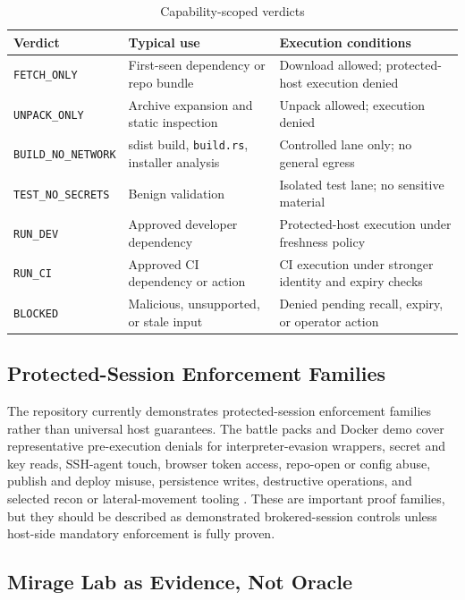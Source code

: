 \documentclass[conference]{IEEEtran}
\begin{document}
\begin{table}[t]
\caption{Capability-scoped verdicts}
\label{tab:verdicts}
\centering
\scriptsize
\setlength{\tabcolsep}{2pt}
\begin{tabularx}{\columnwidth}{@{}L{0.25\columnwidth}L{0.24\columnwidth}Y@{}}
\toprule
\textbf{Verdict} & \textbf{Typical use} & \textbf{Execution conditions} \\
\midrule
\texttt{FETCH\_ONLY} & First-seen dependency or repo bundle & Download allowed; protected-host execution denied \\
\texttt{UNPACK\_ONLY} & Archive expansion and static inspection & Unpack allowed; execution denied \\
\texttt{BUILD\_NO\_NETWORK} & sdist build, \texttt{build.rs}, installer analysis & Controlled lane only; no general egress \\
\texttt{TEST\_NO\_SECRETS} & Benign validation & Isolated test lane; no sensitive material \\
\texttt{RUN\_DEV} & Approved developer dependency & Protected-host execution under freshness policy \\
\texttt{RUN\_CI} & Approved CI dependency or action & CI execution under stronger identity and expiry checks \\
\texttt{BLOCKED} & Malicious, unsupported, or stale input & Denied pending recall, expiry, or operator action \\
\bottomrule
\end{tabularx}
\end{table}

\subsection{Protected-Session Enforcement Families}

The repository currently demonstrates protected-session enforcement families rather than universal host guarantees. The battle packs and Docker demo cover representative pre-execution denials for interpreter-evasion wrappers, secret and key reads, SSH-agent touch, browser token access, repo-open or config abuse, publish and deploy misuse, persistence writes, destructive operations, and selected recon or lateral-movement tooling \cite{zitpitBenchmarkMatrix2026}. These are important proof families, but they should be described as demonstrated brokered-session controls unless host-side mandatory enforcement is fully proven.

\subsection{Mirage Lab as Evidence, Not Oracle}
\end{document}
